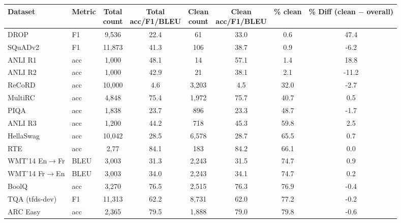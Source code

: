 \begingroup
\setlength{\tabcolsep}{3.5pt}
    \begin{table}[h]
        \centering
        \small
        \begin{tabular}{ll cc cc cc}
        \toprule
        Dataset & Metric & \makecell[c]{Total \\ count} & \makecell[c]{Total \\ acc/F1/BLEU} &  \makecell[c]{Clean \\ count} & \makecell[c]{Clean \\ acc/F1/BLEU} & \% clean & \makecell[c]{\% Diff \\ (clean $-$\\ overall)} \\
        \midrule
        DROP                   & F1       & 9,536  & 22.4 & 61   & 33.0 & 0.6  & 47.4  \\
        SQuADv2              & F1       & 11,873 & 41.3 & 106  & 38.7 & 0.9  & -6.2  \\
        ANLI R1               & acc & 1,000  & 48.1 & 14   & 57.1 & 1.4  & 18.8  \\
        ANLI R2               & acc & 1,000  & 42.9 & 21   & 38.1 & 2.1  & -11.2 \\
        ReCoRD                 & acc & 10,000 & 4.6  & 3,203 & 4.5  & 32.0 & -2.7  \\
        MultiRC                & acc & 4,848  & 75.4 & 1,972 & 75.7 & 40.7 & 0.5   \\
        PIQA                   & acc & 1,838  & 23.7 & 896  & 23.3 & 48.7 & -1.7  \\
        ANLI R3               & acc & 1,200  & 44.2 & 718  & 45.3 & 59.8 & 2.5   \\
        HellaSwag              & acc & 10,042 & 28.5 & 6,578 & 28.7 & 65.5 & 0.7   \\
        RTE                    & acc & 2,77   & 84.1 & 183  & 84.2 & 66.1 & 0.0   \\
        WMT'14 En$\rightarrow$Fr            & BLEU     & 3,003  & 31.3 & 2,243 & 31.5 & 74.7 & 0.9   \\
        WMT'14 Fr$\rightarrow$En            & BLEU     & 3,003  & 34.0 & 2,243 & 34.1 & 74.7 & 0.2   \\
        BoolQ                & acc & 3,270  & 76.5 & 2,515 & 76.3 & 76.9 & -0.4  \\
        TQA (tfds-dev)             & F1       & 11,313 & 62.2 & 8,731 & 62.0 & 77.2 & -0.2  \\
        ARC Easy              & acc & 2,365  & 79.5 & 1,888 & 79.0 & 79.8 & -0.6  \\

\end{tabular}
\end{table}
